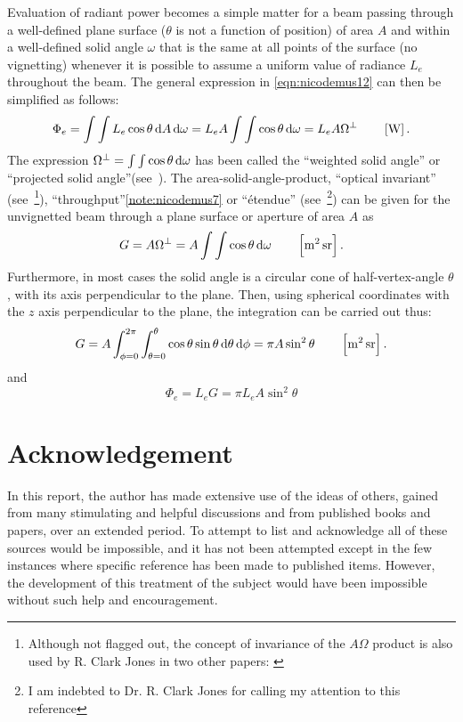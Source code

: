 \begin{refsection}
Evaluation of radiant power becomes a %
simple matter for a beam passing
through
a well-defined plane surface ($\theta$ is not a function of position) of area
$A$
and within a well-defined solid angle $\omega$ that is the same at all points of
the
surface (no vignetting) whenever it is possible to assume a uniform value of
radiance
$L_e$ throughout the beam. The general expression in \cref{eqn:nicodemus12} can
then be simplified as follows:
\begin{equation}
\Phi_e = \int \int L_e \cos\theta \d A \d \omega = L_e A \int \int \cos\theta
\d \omega =
L_e A \Omega^\perp
\qquad \left[\unit{\watt}\right].
\end{equation}
The expression $\Omega^\perp = \int \int \cos\theta \mathop{}\!\mathrm{d} \omega$ has been called the
``weighted solid angle'' or ``projected solid angle''(see~\cite{jones60}).
The area-solid-angle-product, ``optical invariant''
(see~\cite{jones62a}\footnote{Although not flagged out, the concept of
invariance of the $A\Omega$ product is also used by R. Clark Jones in two other
papers: \cite{jones53,jones62b}}), ``throughput''\cref{note:nicodemus7} or
``\'etendue'' (see~\cite{connes58}\footnote{I am indebted to Dr. R. Clark
Jones for calling my attention to this reference}) can be given for the
unvignetted beam through a plane surface or aperture of area $A$ as
\begin{equation}
G = A\Omega^\perp = A \int \int \cos\theta \d \omega
\qquad \left[\unit{\square\meter\steradian}\right].
\end{equation}
Furthermore, in most cases the solid angle is a circular cone of
half-vertex-angle
$\theta$, with its axis perpendicular to the plane. Then, using spherical
coordinates
with the $z$ axis perpendicular to the plane, the integration can be carried out thus:
\begin{equation}
G = A\int_{\phi = 0}^{2\pi} \int_{\theta=0}^{\theta}\cos\theta \sin\theta\d\theta \d\phi
=\pi A \sin^2\theta
\qquad \left[\unit{\square\meter\steradian}\right].
\end{equation}
and
\begin{equation}
\Phi_e = L_e G = \pi L_e A \sin^2\theta
\end{equation}

\section{Acknowledgement}

In this report, the author has made extensive use of the ideas of others, gained
from many stimulating and helpful discussions and from published books and
papers, over an extended period. To attempt to list and acknowledge all of these
sources would be impossible, and it has not been attempted except in the few
instances where specific reference has been made to published items. However,
the development of this treatment of the subject would have been impossible
without such help and encouragement.


\end{refsection}
